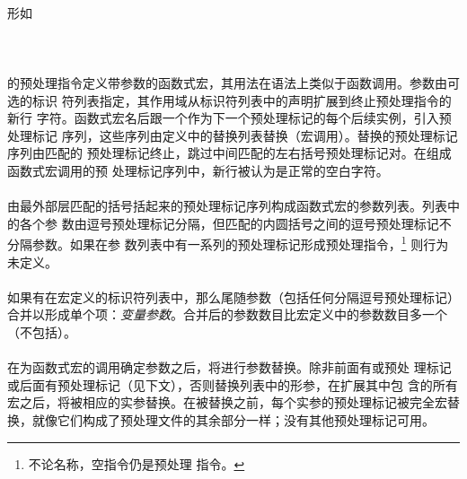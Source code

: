 {\paragraph{}
形如                                                                          \\
\mbox{\hspace{4em}  \tm{)} }           \\
\mbox{\hspace{4em}  
  }                                             \\
\mbox{\hspace{4em} 
   }                                \\
的预处理指令定义带参数的函数式宏，其用法在语法上类似于函数调用。参数由可选的标识
符列表指定，其作用域从标识符列表中的声明扩展到终止预处理指令的新行
字符。函数式宏名后跟一个\tm{(}作为下一个预处理标记的每个后续实例，引入预处理标记
序列，这些序列由定义中的替换列表替换（宏调用）。替换的预处理标记序列由匹配的
\tm{)}预处理标记终止，跳过中间匹配的左右括号预处理标记对。在组成函数式宏调用的预
处理标记序列中，新行被认为是正常的空白字符。

\paragraph{}
由最外部层匹配的括号括起来的预处理标记序列构成函数式宏的参数列表。列表中的各个参
数由逗号预处理标记分隔，但匹配的内圆括号之间的逗号预处理标记不分隔参数。如果在参
数列表中有一系列的预处理标记形成预处理指令，\footnote{不论名称，空指令仍是预处理
指令。} 则行为未定义。

\paragraph{}
如果有在宏定义的标识符列表中，那么尾随参数（包括任何分隔逗号预处理标记）
合并以形成单个项：\textit{变量参数}。合并后的参数数目比宏定义中的参数数目多一个
（不包括）。

\paragraph{}
在为函数式宏的调用确定参数之后，将进行参数替换。除非前面有\tm{\#}或\tm{\#\#}预处
理标记或后面有\tm{\#\#}预处理标记（见下文），否则替换列表中的形参，在扩展其中包
含的所有宏之后，将被相应的实参替换。在被替换之前，每个实参的预处理标记被完全宏替
换，就像它们构成了预处理文件的其余部分一样；没有其他预处理标记可用。

}
